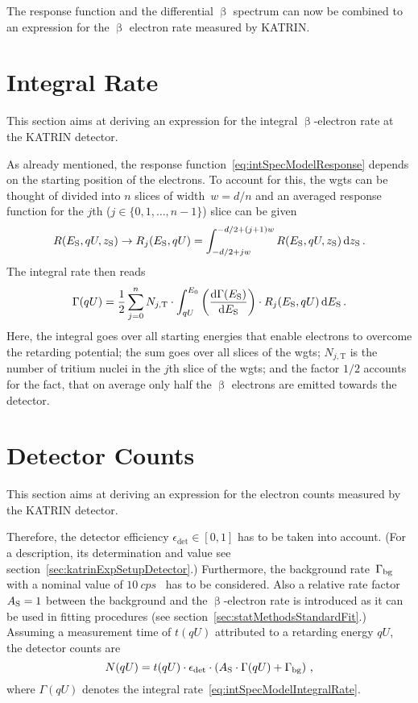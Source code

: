 The response function and the differential $\upbeta$ spectrum can now be combined to an expression for the $\upbeta$ electron rate measured by KATRIN. 

\section{Integral Rate}
\label{sec:intSpecModelIntegralRate}
This section aims at deriving an expression for the integral $\upbeta$-electron rate at the KATRIN detector. 

As already mentioned, the response function~\eqref{eq:intSpecModelResponse} depends on the starting position of the electrons. To account for this, the \gls{wgts} can be thought of divided into $n$ slices of width~$w=d/n$ and an averaged response function for the $j$th ($j\in\{0,1,\dots,n-1\}$) slice can be given
\begin{equation}
	R(E_\mathrm{S},qU,z_\mathrm{S}) \rightarrow
	R_j(E_\mathrm{S},qU) =
	\int_{-d/2+jw}^{-d/2+(j+1)w}
		R(E_\mathrm{S},qU,z_\mathrm{S})
	\mathop{}\!\mathrm{d} z_\mathrm{S}
	\text{\,.}
\end{equation}
The integral rate then reads~\cite{Kleesiek2019}
\begin{equation}
	\label{eq:intSpecModelIntegralRate}
	\Gamma(qU) = 
	\frac{1}{2} 
	\sum_{j=0}^{n} N_{j, \mathrm{T}} \cdot
		\int_{qU}^{E_0} 
			\left(\frac{\mathop{}\!\mathrm{d} \Gamma(E_\mathrm{S})}{ \mathop{}\!\mathrm{d} E_\mathrm{S}}\right) \cdot 
			R_j(E_\mathrm{S}, qU) 
		\mathop{}\!\mathrm{d} E_\mathrm{S}
		\text{\,.}
\end{equation}
Here, the integral goes over all starting energies that enable electrons to overcome the retarding potential; the sum goes over all slices of the \gls{wgts}; $N_{j, \mathrm{T}}$ is the number of tritium nuclei in the $j$th slice of the \gls{wgts}; and the factor $1/2$ accounts for the fact, that on average only half the $\upbeta$ electrons are emitted towards the detector.

\section{Detector Counts}
\label{sec:intSpecModelDetectorCounts}
This section aims at deriving an expression for the electron counts measured by the KATRIN detector. 

Therefore, the detector efficiency \mbox{$\epsilon_\mathrm{det}\in[0,1]$} has to be taken into account. (For a description, its determination and value see section~\ref{sec:katrinExpSetupDetector}.) Furthermore, the background rate~$\Gamma_{\mathrm{bg}}$ with a nominal value of $\SI{10}{cps}$~\cite{Angrik:2005ep} has to be considered. Also a relative rate factor $A_{\mathrm{S}}=1$ between the background and the $\upbeta$-electron rate is introduced as it can be used in fitting procedures (see section~\ref{sec:statMethodsStandardFit}.) Assuming a measurement time of $t(qU)$ attributed to a retarding energy $qU$, the detector counts are~\cite{Kleesiek2014}
\begin{equation}
\label{eq:intSpecModelDetectorCounts}
	N(qU) = t(qU)\cdot\epsilon_\mathrm{det}\cdot
	\left(
		A_{\mathrm{S}}\cdot \Gamma(qU) + \Gamma_{\mathrm{bg}}
	\right)
	\text{\,,}
\end{equation}
where $\Gamma(qU)$ denotes the integral rate~\eqref{eq:intSpecModelIntegralRate}. 

